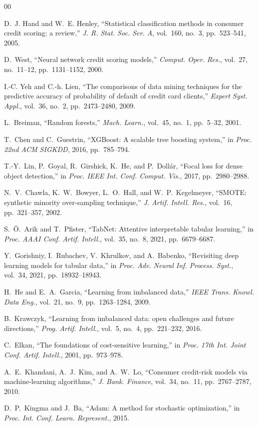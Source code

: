 \documentclass[conference]{IEEEtran}
\begin{document}
\begin{thebibliography}{00}

D.~J. Hand and W.~E. Henley, ``Statistical classification methods in consumer credit scoring: a review,'' \textit{J. R. Stat. Soc. Ser. A}, vol.~160, no.~3, pp.~523--541, 2005.

D.~West, ``Neural network credit scoring models,'' \textit{Comput. Oper. Res.}, vol.~27, no.~11--12, pp.~1131--1152, 2000.

I.-C. Yeh and C.-h. Lien, ``The comparisons of data mining techniques for the predictive accuracy of probability of default of credit card clients,'' \textit{Expert Syst. Appl.}, vol.~36, no.~2, pp.~2473--2480, 2009.

L.~Breiman, ``Random forests,'' \textit{Mach. Learn.}, vol.~45, no.~1, pp.~5--32, 2001.

T.~Chen and C.~Guestrin, ``XGBoost: A scalable tree boosting system,'' in \textit{Proc. 22nd ACM SIGKDD}, 2016, pp.~785--794.

T.-Y.~Lin, P.~Goyal, R.~Girshick, K.~He, and P.~Doll\'{a}r, ``Focal loss for dense object detection,'' in \textit{Proc. IEEE Int. Conf. Comput. Vis.}, 2017, pp.~2980--2988.

N.~V.~Chawla, K.~W.~Bowyer, L.~O.~Hall, and W.~P.~Kegelmeyer, ``SMOTE: synthetic minority over-sampling technique,'' \textit{J. Artif. Intell. Res.}, vol.~16, pp.~321--357, 2002.

S.~{\"O}.~Arik and T.~Pfister, ``TabNet: Attentive interpretable tabular learning,'' in \textit{Proc. AAAI Conf. Artif. Intell.}, vol.~35, no.~8, 2021, pp.~6679--6687.

Y.~Gorishniy, I.~Rubachev, V.~Khrulkov, and A.~Babenko, ``Revisiting deep learning models for tabular data,'' in \textit{Proc. Adv. Neural Inf. Process. Syst.}, vol.~34, 2021, pp.~18932--18943.

H.~He and E.~A.~Garcia, ``Learning from imbalanced data,'' \textit{IEEE Trans. Knowl. Data Eng.}, vol.~21, no.~9, pp.~1263--1284, 2009.

B.~Krawczyk, ``Learning from imbalanced data: open challenges and future directions,'' \textit{Prog. Artif. Intell.}, vol.~5, no.~4, pp.~221--232, 2016.

C.~Elkan, ``The foundations of cost-sensitive learning,'' in \textit{Proc. 17th Int. Joint Conf. Artif. Intell.}, 2001, pp.~973--978.

A.~E.~Khandani, A.~J.~Kim, and A.~W.~Lo, ``Consumer credit-risk models via machine-learning algorithms,'' \textit{J. Bank. Finance}, vol.~34, no.~11, pp.~2767--2787, 2010.

D.~P.~Kingma and J.~Ba, ``Adam: A method for stochastic optimization,'' in \textit{Proc. Int. Conf. Learn. Represent.}, 2015.

\end{thebibliography}
\end{document}
